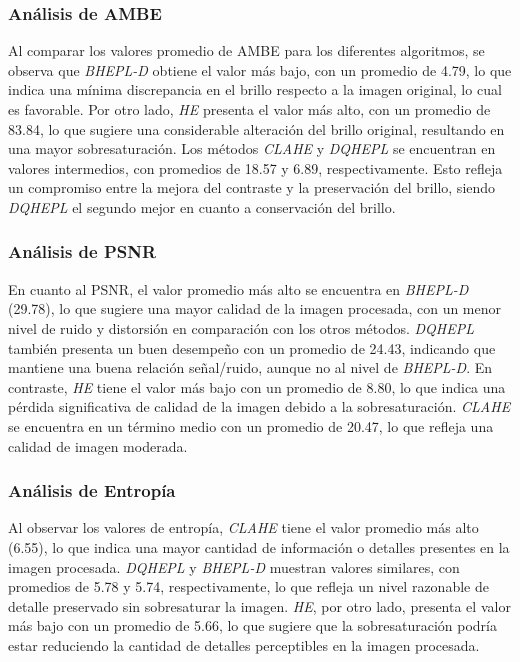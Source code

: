 \documentclass[sigchi]{acmart}
\begin{document}
\subsubsection{Análisis de AMBE}
\label{subsubsec:analisis_ambe}

Al comparar los valores promedio de AMBE para los diferentes algoritmos, se observa que
\emph{BHEPL-D} obtiene el valor más bajo, con un promedio de 4.79, lo que indica una mínima
discrepancia en el brillo respecto a la imagen original, lo cual es favorable. Por otro lado,
\emph{HE} presenta el valor más alto, con un promedio de 83.84, lo que sugiere una
considerable alteración del brillo original, resultando en una mayor sobresaturación. Los
métodos \emph{CLAHE} y \emph{DQHEPL} se encuentran en valores intermedios, con promedios de
18.57 y 6.89, respectivamente. Esto refleja un compromiso entre la mejora del contraste y la
preservación del brillo, siendo \emph{DQHEPL} el segundo mejor en cuanto a conservación del
brillo.

\subsubsection{Análisis de PSNR}
\label{subsubsec:analisis_psnr}

En cuanto al PSNR, el valor promedio más alto se encuentra en \emph{BHEPL-D} (29.78), lo que
sugiere una mayor calidad de la imagen procesada, con un menor nivel de ruido y distorsión en
comparación con los otros métodos. \emph{DQHEPL} también presenta un buen desempeño con un
promedio de 24.43, indicando que mantiene una buena relación señal/ruido, aunque no al nivel de
\emph{BHEPL-D}. En contraste, \emph{HE} tiene el valor más bajo con un promedio de 8.80, lo
que indica una pérdida significativa de calidad de la imagen debido a la sobresaturación.
\emph{CLAHE} se encuentra en un término medio con un promedio de 20.47, lo que refleja una
calidad de imagen moderada.

\subsubsection{Análisis de Entropía}
\label{subsubsec:analisis_entropia}

Al observar los valores de entropía, \emph{CLAHE} tiene el valor promedio más alto (6.55), lo
que indica una mayor cantidad de información o detalles presentes en la imagen procesada.
\emph{DQHEPL} y \emph{BHEPL-D} muestran valores similares, con promedios de 5.78 y 5.74,
respectivamente, lo que refleja un nivel razonable de detalle preservado sin sobresaturar la
imagen. \emph{HE}, por otro lado, presenta el valor más bajo con un promedio de 5.66, lo que
sugiere que la sobresaturación podría estar reduciendo la cantidad de detalles perceptibles en
la imagen procesada.
\end{document}
